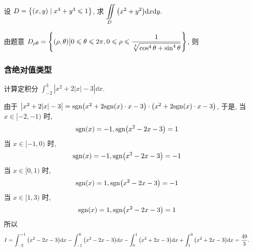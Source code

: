 \begin{example}
    设 $D=\qty{(x, y)\mid x^{4}+y^{4}\leqslant 1}$, 求 $\displaystyle \iint\limits_D\qty(x^2+y^2)\dd x\dd y.$
\end{example}
\begin{solution}
    由题意 $D_{\rho\theta}=\qty{(\rho,\theta)\big|0\leqslant \theta\leqslant 2\pi,0\leqslant \rho\leqslant \dfrac{1}{\sqrt[4]{\cos^4\theta+\sin^4\theta}}}$, 则
\end{solution}

\subsubsection{含绝对值类型}

\begin{example}
    计算定积分 $\displaystyle\int_{-2}^{3}\left |x^2+2|x|-3\right |\dd x$.
\end{example}
\begin{solution}
    由于 $\left |x^2+2|x|-3\right |=\mathrm{sgn} \qty(x^2+2\mathrm{sgn} (x)\cdot x-3)\cdot\qty(x^2+2\mathrm{sgn} (x)\cdot x-3)$, 于是,
    当 $x\in[-2,-1)$ 时, $$\mathrm{sgn} (x)=-1,\mathrm{sgn} \qty(x^2-2x-3)=1$$
    当 $x\in[-1,0)$ 时, $$\mathrm{sgn} (x)=-1,\mathrm{sgn} \qty(x^2-2x-3)=-1$$
    当 $x\in[0,1)$ 时, $$\mathrm{sgn} (x)=1,\mathrm{sgn} \qty(x^2-2x-3)=-1$$
    当 $x\in[1,3)$ 时, $$\mathrm{sgn} (x)=1,\mathrm{sgn} \qty(x^2-2x-3)=1$$
    所以 $$I=\int_{-2}^{-1}\qty(x^2-2x-3)\dd x-\int_{-1}^{0}\qty(x^2-2x-3)\dd x-\int_{0}^{1}\qty(x^2+2x-3)\dd x+\int_{1}^{3}\qty(x^2+2x-3)\dd x=\dfrac{49}{3}.$$
\end{solution}

